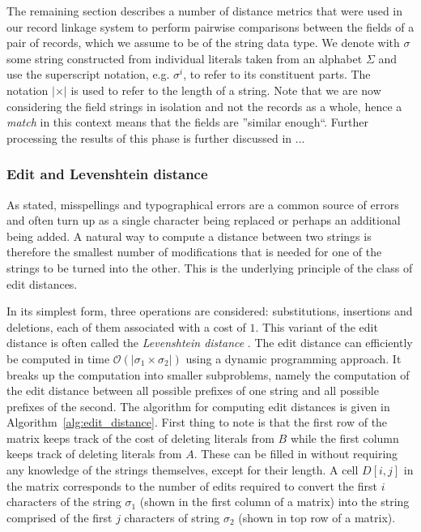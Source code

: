 The remaining section describes a number of distance metrics that were used in our record linkage system to perform pairwise comparisons between the fields of a pair of records, which we assume to be of the string data type.
We denote with $\sigma$ some string constructed from individual literals taken from an alphabet $\Sigma$ and use the superscript notation, e.g. $\sigma^{i}$, to refer to its constituent parts.
The notation $\vert \times \vert$ is used to refer to the length of a string.
Note that we are now considering the field strings in isolation and not the records as a whole, hence a \emph{match} in this context means that the fields are ''similar enough``.
Further processing the results of this phase is further discussed in ...




\subsubsection{Edit and Levenshtein distance}
\label{sec:edit_distance}

As stated, misspellings and typographical errors are a common source of errors and often turn up as a single character being replaced or perhaps an additional being added.
A natural way to compute a distance between two strings is therefore the smallest number of modifications that is needed for one of the strings to be turned into the other.
This is the underlying principle of the class of edit distances.

In its simplest form, three operations are considered: substitutions, insertions and deletions, each of them associated with a cost of $1$.
This variant of the edit distance is often called the \emph{Levenshtein distance} .
The edit distance can efficiently be computed in time $\mathcal{O}(\vert \sigma_1 \times \sigma_2 \vert)$ using a dynamic programming approach.
It breaks up the computation into smaller subproblems, namely the computation of the edit distance between all possible prefixes of one string and all possible prefixes of the second.
The algorithm for computing edit distances is given in Algorithm~\ref{alg:edit_distance}.
First thing to note is that the first row of the matrix keeps track of the cost of deleting literals from $B$ while the first column keeps track of deleting literals from $A$.
These can be filled in without requiring any knowledge of the strings themselves, except for their length.
A cell $D[i,j]$ in the matrix corresponds to the number of edits required to convert the first $i$ characters of the string $\sigma_1$ (shown in the first column of a matrix) into the string comprised of the first $j$ characters of string $\sigma_2$ (shown in top row of a matrix).\cite{christen12}

